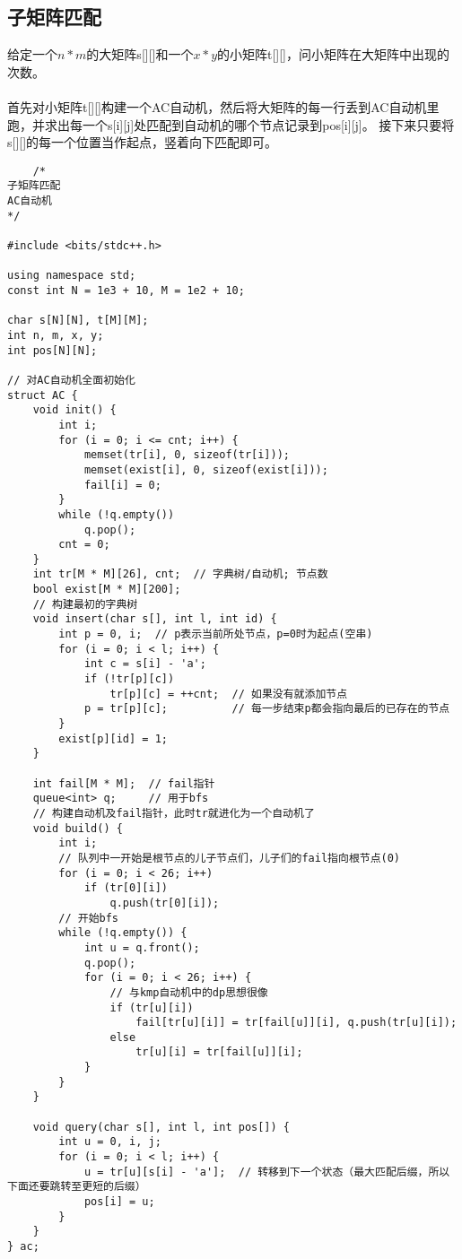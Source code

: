     \subsection{子矩阵匹配}
        给定一个$n*m$的大矩阵s[][]和一个$x*y$的小矩阵t[][]，问小矩阵在大矩阵中出现的次数。\\\\
        首先对小矩阵t[][]构建一个AC自动机，然后将大矩阵的每一行丢到AC自动机里跑，并求出每一个s[i][j]处匹配到自动机的哪个节点记录到pos[i][j]。
        接下来只要将s[][]的每一个位置当作起点，竖着向下匹配即可。
\begin{lstlisting}
    /*
子矩阵匹配
AC自动机
*/

#include <bits/stdc++.h>

using namespace std;
const int N = 1e3 + 10, M = 1e2 + 10;

char s[N][N], t[M][M];
int n, m, x, y;
int pos[N][N];

// 对AC自动机全面初始化
struct AC {
    void init() {
        int i;
        for (i = 0; i <= cnt; i++) {
            memset(tr[i], 0, sizeof(tr[i]));
            memset(exist[i], 0, sizeof(exist[i]));
            fail[i] = 0;
        }
        while (!q.empty())
            q.pop();
        cnt = 0;
    }
    int tr[M * M][26], cnt;  // 字典树/自动机; 节点数
    bool exist[M * M][200];
    // 构建最初的字典树
    void insert(char s[], int l, int id) {
        int p = 0, i;  // p表示当前所处节点，p=0时为起点(空串)
        for (i = 0; i < l; i++) {
            int c = s[i] - 'a';
            if (!tr[p][c])
                tr[p][c] = ++cnt;  // 如果没有就添加节点
            p = tr[p][c];          // 每一步结束p都会指向最后的已存在的节点
        }
        exist[p][id] = 1;
    }

    int fail[M * M];  // fail指针
    queue<int> q;     // 用于bfs
    // 构建自动机及fail指针，此时tr就进化为一个自动机了
    void build() {
        int i;
        // 队列中一开始是根节点的儿子节点们，儿子们的fail指向根节点(0)
        for (i = 0; i < 26; i++)
            if (tr[0][i])
                q.push(tr[0][i]);
        // 开始bfs
        while (!q.empty()) {
            int u = q.front();
            q.pop();
            for (i = 0; i < 26; i++) {
                // 与kmp自动机中的dp思想很像
                if (tr[u][i])
                    fail[tr[u][i]] = tr[fail[u]][i], q.push(tr[u][i]);
                else
                    tr[u][i] = tr[fail[u]][i];
            }
        }
    }

    void query(char s[], int l, int pos[]) {
        int u = 0, i, j;
        for (i = 0; i < l; i++) {
            u = tr[u][s[i] - 'a'];  // 转移到下一个状态（最大匹配后缀，所以下面还要跳转至更短的后缀）
            pos[i] = u;
        }
    }
} ac;


\end{lstlisting}
